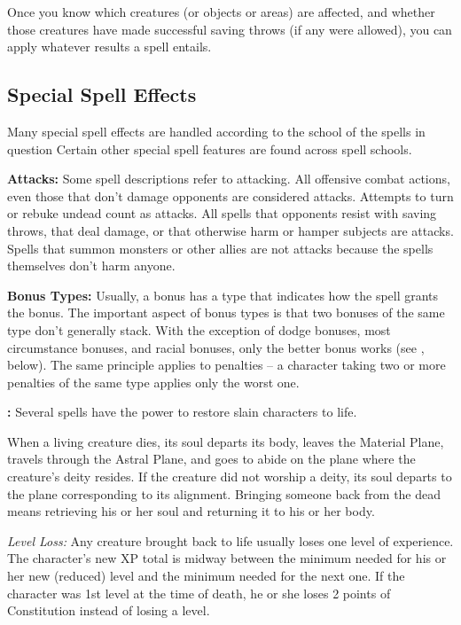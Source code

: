 Once you know which creatures (or objects or areas) are affected, and whether those 
creatures have made successful saving throws (if any were allowed), you can apply 
whatever results a spell entails.

\subsection{Special Spell Effects}

Many special spell effects are handled according to the school of the spells in 
question Certain other special spell features are found across spell schools.

\textbf{Attacks:} Some spell descriptions refer to attacking. All offensive combat 
actions, even those that don't damage opponents are considered attacks. Attempts 
to turn or rebuke undead count as attacks. All spells that opponents resist with 
saving throws, that deal damage, or that otherwise harm or hamper subjects are 
attacks. Spells that summon monsters or other allies are not attacks because the 
spells themselves don't harm anyone.

\textbf{Bonus Types:} Usually, a bonus has a type that indicates how the spell 
grants the bonus. The important aspect of bonus types is that two bonuses of the 
same type don't generally stack. With the exception of dodge bonuses, most circumstance 
bonuses, and racial bonuses, only the better bonus works (see ,
below). The same principle applies to penalties -- a character taking two 
or more penalties of the same type applies only the worst one.

\textbf{:} Several spells have the power to restore slain 
characters to life.

When a living creature dies, its soul departs its body, leaves the Material Plane, 
travels through the Astral Plane, and goes to abide on the plane where the creature's 
deity resides. If the creature did not worship a deity, its soul departs to the 
plane corresponding to its alignment. Bringing someone back from the dead means 
retrieving his or her soul and returning it to his or her body.

\textit{Level Loss:} Any creature brought back to life usually loses one level 
of experience. The character's new XP total is midway between the minimum needed 
for his or her new (reduced) level and the minimum needed for the next one. If 
the character was 1st level at the time of death, he or she loses 2 points of Constitution 
instead of losing a level.

